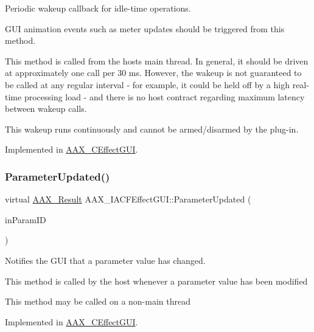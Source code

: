 Periodic wakeup callback for idle-\/time operations. 

G\+UI animation events such as meter updates should be triggered from this method.

This method is called from the host\textquotesingle{}s main thread. In general, it should be driven at approximately one call per 30 ms. However, the wakeup is not guaranteed to be called at any regular interval -\/ for example, it could be held off by a high real-\/time processing load -\/ and there is no host contract regarding maximum latency between wakeup calls.

This wakeup runs continuously and cannot be armed/disarmed by the plug-\/in. 

Implemented in \mbox{\hyperlink{a01477_a0b7bada7e7d72da637bde2daa79f71ee}{A\+A\+X\+\_\+\+C\+Effect\+G\+UI}}.

\mbox{\label{a01665_a45b468fef806611581f748af9301ab4d}} 
\subsubsection{\texorpdfstring{ParameterUpdated()}{ParameterUpdated()}}
{\footnotesize\ttfamily virtual \mbox{\hyperlink{a00392_a4d8f69a697df7f70c3a8e9b8ee130d2f}{A\+A\+X\+\_\+\+Result}} A\+A\+X\+\_\+\+I\+A\+C\+F\+Effect\+G\+U\+I\+::\+Parameter\+Updated (\begin{DoxyParamCaption}\item[{\mbox{\hyperlink{a00392_a1440c756fe5cb158b78193b2fc1780d1}{A\+A\+X\+\_\+\+C\+Param\+ID}}}]{in\+Param\+ID }\end{DoxyParamCaption})\hspace{0.3cm}{\ttfamily [pure virtual]}}



Notifies the G\+UI that a parameter value has changed. 

This method is called by the host whenever a parameter value has been modified

This method may be called on a non-\/main thread 

Implemented in \mbox{\hyperlink{a01477_aa86943fbaf8920b533ea31a7669fb009}{A\+A\+X\+\_\+\+C\+Effect\+G\+UI}}.

\mbox{\label{a01665_a81450c5272935689a4fb9c1820d6bba8}} 
